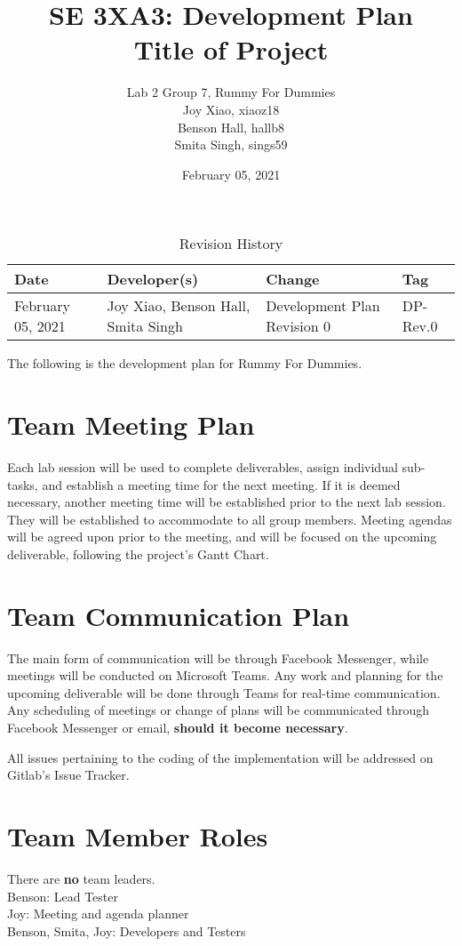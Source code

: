 \documentclass[12pt]{article}
\title{SE 3XA3: Development Plan\\Title of Project}
\author{Lab 2 Group 7, Rummy For Dummies
		\\ Joy Xiao, xiaoz18
		\\ Benson Hall, hallb8
		\\ Smita Singh, sings59
}
\date{February 05, 2021}
\begin{document}
\begin{table}[ht]
    \centering
    \caption{Revision History}
    \label{TblRevisionHistory}
    \begin{tabular}{|p{2cm}|p{5cm}|p{5.3cm}|p{2cm}|}
    \hline
    \textbf{Date} & \textbf{Developer(s)} & \textbf{Change} & \textbf{Tag} \\
    \hline
    February 05, 2021 & Joy Xiao, Benson Hall, Smita Singh & Development Plan Revision 0 & DP-Rev.0 \\
    \hline
    \end{tabular}
\end{table}

\clearpage

\maketitle

The following is the development plan for Rummy For Dummies.

\section{Team Meeting Plan}
Each lab session will be used to complete deliverables, assign individual sub-tasks, and establish a meeting time for the next meeting. If it is deemed necessary, another meeting time will be established prior to the next lab session. They will be established to accommodate to all group members. Meeting agendas will be agreed upon prior to the meeting, and will be focused on the upcoming deliverable, following the project's Gantt Chart.

\section{Team Communication Plan}
The main form of communication will be through Facebook Messenger, while meetings will be conducted on Microsoft Teams. Any work and planning for the upcoming deliverable will be done through Teams for real-time communication. Any scheduling of meetings or change of plans will be communicated through Facebook Messenger or email, \textbf{should it become necessary}. 

All issues pertaining to the coding of the implementation will be addressed on Gitlab's Issue Tracker.

\section{Team Member Roles}
There are \textbf{no} team leaders. \\
Benson: Lead Tester \\
Joy: Meeting and agenda planner \\
Benson, Smita, Joy: Developers and Testers
\end{document}
